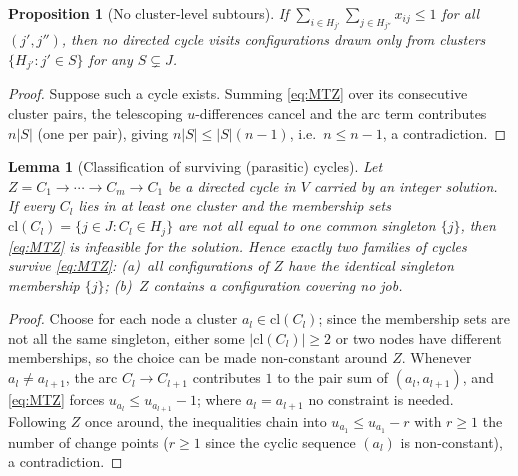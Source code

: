 \documentclass[11pt,a4paper]{article}
\theoremstyle{plain}
\newtheorem{lemma}[theorem]{Lemma}
\newtheorem{proposition}[theorem]{Proposition}
\theoremstyle{definition}
\begin{document}
\begin{thmbox}
	\begin{proposition}[No cluster-level subtours]
		\label{prop:MTZ}
		If $\sum_{i\in H_{j'}}\sum_{j\in H_{j''}} x_{ij}\le 1$ for all $(j',j'')$, then no
		directed cycle visits configurations drawn only from clusters $\{H_{j'}:j'\in S\}$ for
		any $S\subsetneq J$.
	\end{proposition}
\end{thmbox}
\begin{proofbox}
	\begin{proof}
		Suppose such a cycle exists. Summing \eqref{eq:MTZ} over its consecutive cluster pairs,
		the telescoping $u$-differences cancel and the arc term contributes $n|S|$ (one per
		pair), giving $n|S|\le|S|(n-1)$, i.e.\ $n\le n-1$, a contradiction.
	\end{proof}
\end{proofbox}

\begin{thmbox}
	\begin{lemma}[Classification of surviving (parasitic) cycles]
		\label{lem:parasitic}
		Let $Z=C_1\to\cdots\to C_m\to C_1$ be a directed cycle in $V$ carried by an integer
		solution. If every $C_l$ lies in at least one cluster and the membership sets
		$\mathrm{cl}(C_l)=\{j\in J: C_l\in H_j\}$ are not all equal to one common singleton
		$\{j\}$, then \eqref{eq:MTZ} is infeasible for the solution. Hence exactly two
		families of cycles survive \eqref{eq:MTZ}:
		(a)~all configurations of $Z$ have the identical singleton membership $\{j\}$;
		(b)~$Z$ contains a configuration covering no job.
	\end{lemma}
\end{thmbox}
\begin{proofbox}
	\begin{proof}
		Choose for each node a cluster $a_l\in\mathrm{cl}(C_l)$; since the membership sets are
		not all the same singleton, either some $|\mathrm{cl}(C_l)|\ge2$ or two nodes have
		different memberships, so the choice can be made non-constant around $Z$. Whenever
		$a_l\ne a_{l+1}$, the arc $C_l\to C_{l+1}$ contributes $1$ to the pair sum of
		$(a_l,a_{l+1})$, and \eqref{eq:MTZ} forces $u_{a_l}\le u_{a_{l+1}}-1$; where
		$a_l=a_{l+1}$ no constraint is needed. Following $Z$ once around, the inequalities
		chain into $u_{a_1}\le u_{a_1}-r$ with $r\ge1$ the number of change points
		($r\geq 1$ since the cyclic sequence $(a_l)$ is non-constant), a contradiction.
	\end{proof}
\end{proofbox}
\end{document}
